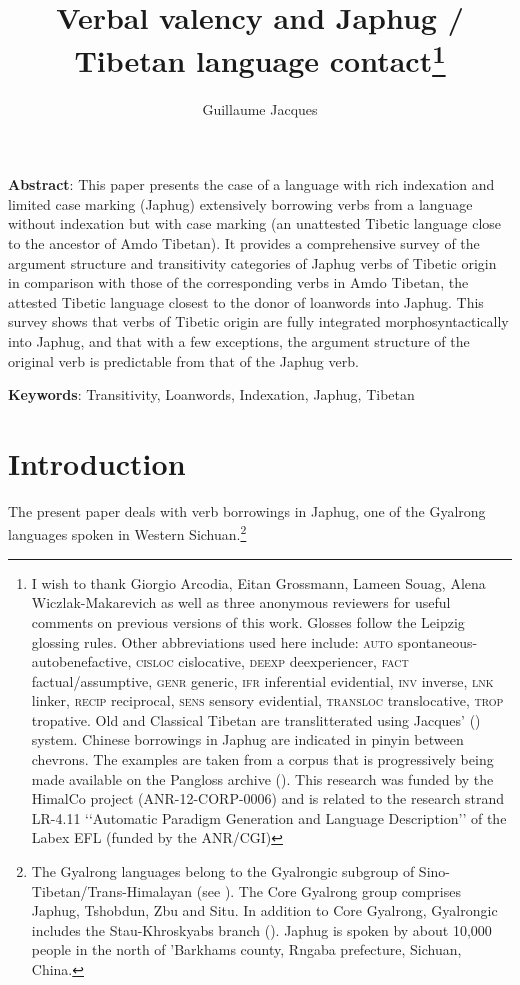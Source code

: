 \documentclass[oldfontcommands,oneside,a4paper,11pt]{article}
\begin{document}
 
\title{Verbal valency and Japhug / Tibetan language contact\footnote{I wish to thank Giorgio Arcodia, Eitan Grossmann, Lameen Souag, Alena Wiczlak-Makarevich as well as three anonymous reviewers for useful comments on previous versions of this work. Glosses follow the Leipzig glossing rules. Other abbreviations used here include: \textsc{auto} spontaneous-autobenefactive, \textsc{cisloc} cislocative,  \textsc{deexp} deexperiencer, \textsc{fact} factual/assumptive, \textsc{genr} generic, \textsc{ifr} inferential evidential,  \textsc{inv} inverse, \textsc{lnk} linker, \textsc{recip} reciprocal, \textsc{sens} sensory  evidential, \textsc{transloc} translocative, \textsc{trop} tropative.  Old and Classical Tibetan are translitterated using Jacques' (\citeyear{jacques12transcription}) system.  Chinese borrowings in Japhug are indicated in pinyin between chevrons. The examples are taken from a corpus that is progressively being made available on the Pangloss archive (\citealt{michailovsky14pangloss}). This research was funded by the HimalCo project (ANR-12-CORP-0006) and is related to the research strand LR-4.11 ‘‘Automatic Paradigm Generation and Language Description’’ of the Labex EFL (funded by the ANR/CGI) }} 
\author{Guillaume Jacques}
\maketitle 

\textbf{Abstract}: This paper presents the case of a language with rich indexation and limited case marking (Japhug) extensively borrowing verbs from a language without indexation but with case marking (an unattested Tibetic language close to the ancestor of Amdo Tibetan). It provides a comprehensive survey of the argument structure and transitivity categories of Japhug verbs of Tibetic origin in comparison with those of the corresponding verbs in Amdo Tibetan, the attested Tibetic language closest to the donor of loanwords into Japhug. This survey shows that verbs of Tibetic origin are fully integrated morphosyntactically into Japhug, and that with a few exceptions, the argument structure of the original verb is predictable from that of the Japhug verb.

\textbf{Keywords}: Transitivity, Loanwords, Indexation, Japhug, Tibetan


\section{Introduction}
The present paper deals with verb borrowings in Japhug, one of the Gyalrong languages spoken in Western Sichuan.\footnote{The Gyalrong languages belong to the Gyalrongic subgroup of Sino-Tibetan/Trans-Himalayan (see \citealt{jackson00puxi}). The Core Gyalrong group comprises Japhug, Tshobdun, Zbu and Situ. In addition to Core Gyalrong, Gyalrongic includes the Stau-Khroskyabs branch (\citealt{lai15person}). Japhug is spoken by about 10,000 people in the north of 'Barkhams county, Rngaba prefecture, Sichuan, China. } 
\end{document}
